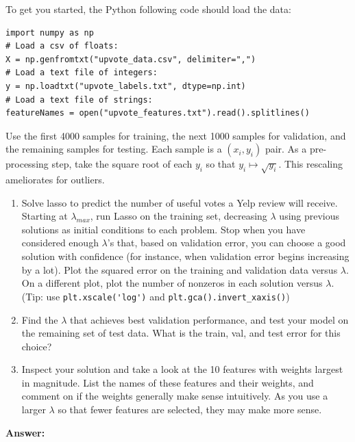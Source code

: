 \documentclass{article}
\newcommand{\1}{\mathbf{1}}
\begin{document}
To get you started, the Python following code should load the data:

\begin{verbatim}
import numpy as np
# Load a csv of floats:
X = np.genfromtxt("upvote_data.csv", delimiter=",")
# Load a text file of integers:
y = np.loadtxt("upvote_labels.txt", dtype=np.int)
# Load a text file of strings:
featureNames = open("upvote_features.txt").read().splitlines()
\end{verbatim}

Use the first 4000 samples for training, the next 1000 samples for validation, and the remaining samples for testing.
Each sample is a $(x_i,y_i)$ pair. As a pre-processing step, take the square root of each $y_i$ so that $y_i \mapsto \sqrt{y_i}$. This rescaling ameliorates for outliers.
\begin{enumerate}
  \item Solve lasso to predict the number of useful votes a Yelp review will receive.  
  Starting at $\lambda_{max}$, run Lasso on the training set, decreasing $\lambda$ using
  previous solutions as initial conditions to each problem. Stop when you have
  considered enough $\lambda$'s that, based on validation error, you can
  choose a good solution with confidence (for instance, when validation
  error begins increasing by a lot).
  Plot the squared error on the training and validation data versus $\lambda$.
  On a different plot, plot the number of nonzeros in each solution versus $\lambda$.
   (Tip: use \verb|plt.xscale('log')| and \verb|plt.gca().invert_xaxis()|)\\
  \item Find the $\lambda$ that achieves best validation
  performance, and test your model on the remaining set of test data.  What is the train, val, and test error for this choice?
  \item Inspect your solution and take a look at the 10 features with weights largest in magnitude.
  List the names of these features and their weights, and comment on if the weights generally make sense intuitively. As you use a larger $\lambda$ so that fewer features are selected, they may make more sense.
\end{enumerate}  

\textbf{Answer:}
\end{document}
